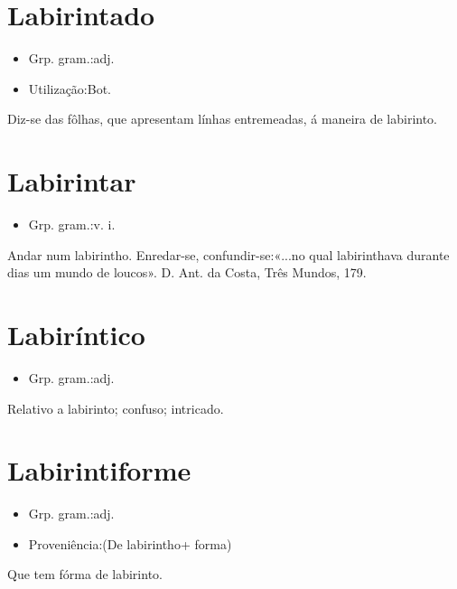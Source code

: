 \section{Labirintado}
\begin{itemize}
\item {Grp. gram.:adj.}
\end{itemize}
\begin{itemize}
\item {Utilização:Bot.}
\end{itemize}
Diz-se das fôlhas, que apresentam línhas entremeadas, á maneira de labirinto.
\section{Labirintar}
\begin{itemize}
\item {Grp. gram.:v. i.}
\end{itemize}
Andar num labirintho.
Enredar-se, confundir-se:«\textunderscore ...no qual labirinthava durante dias um mundo de loucos\textunderscore ». D. Ant. da Costa, \textunderscore Três Mundos\textunderscore , 179.
\section{Labiríntico}
\begin{itemize}
\item {Grp. gram.:adj.}
\end{itemize}
Relativo a labirinto; confuso; intricado.
\section{Labirintiforme}
\begin{itemize}
\item {Grp. gram.:adj.}
\end{itemize}
\begin{itemize}
\item {Proveniência:(De \textunderscore labirintho\textunderscore  + \textunderscore forma\textunderscore )}
\end{itemize}
Que tem fórma de labirinto.
